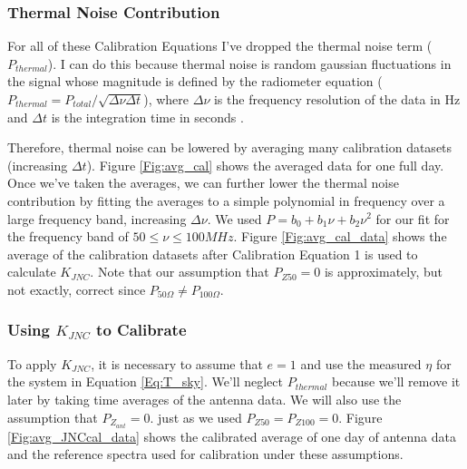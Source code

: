 \subsubsection{Thermal Noise Contribution}

For all of these Calibration Equations I've dropped the thermal noise term ($P_{thermal}$). I can do this because thermal noise is random gaussian fluctuations in the signal whose magnitude is defined by the radiometer equation ($P_{thermal} = P_{total}/\sqrt{\Delta \nu \Delta t}$), where $\Delta \nu$ is the frequency resolution of the data in Hz and $\Delta t$ is the integration time in seconds \cite{stutzman1981}. 

Therefore, thermal noise can be lowered by averaging many calibration datasets (increasing $\Delta t$). Figure \ref{Fig:avg_cal} shows the averaged data for one full day. Once we've taken the averages, we can further lower the thermal noise contribution by fitting the averages to a simple polynomial in frequency over a large frequency band, increasing $\Delta \nu$. We used $P = b_0 + b_1 \nu +b_2 \nu^2$ for our fit for the frequency band of $50 \leq \nu \leq 100MHz$. Figure \ref{Fig:avg_cal_data} shows the average of the calibration datasets after Calibration Equation 1 is used to calculate $K_{JNC}$. Note that our assumption that $P_{Z50}=0$ is approximately, but not exactly, correct since $P_{50 \Omega} \neq P_{100 \Omega}$. 

\subsubsection{Using $K_{JNC}$ to Calibrate}
To apply $K_{JNC}$, it is necessary to assume that $e=1$ and use the measured $\eta$ for the system in Equation \ref{Eq:T_sky}. We'll neglect $P_{thermal}$ because we'll remove it later by taking time averages of the antenna data. We will also use the assumption that $P_{Z_{ant}} = 0$. just as we used $P_{Z50}=P_{Z100}=0$. Figure \ref{Fig:avg_JNCcal_data} shows the calibrated average of one day of antenna data and the reference spectra used for calibration under these assumptions. 

